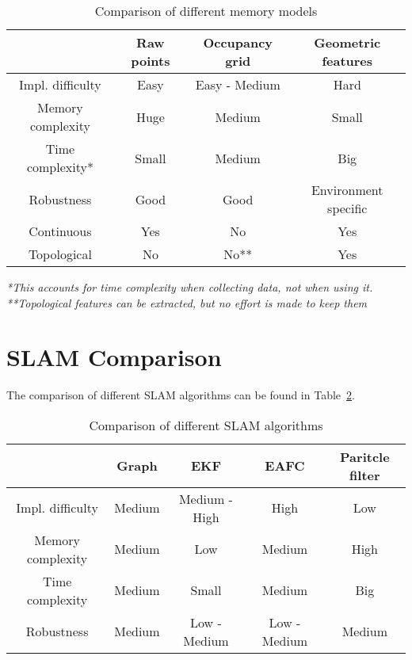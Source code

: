 \documentclass[12pt, a4paper, onecolumn]{article}
\begin{document}
\begin{table}[h!]
  \begin{center}
    \begin{tabular}[c]{|c | c c c|}
      \hline
       & Raw points & Occupancy grid & Geometric features \\
      \hline
      Impl. difficulty & Easy & Easy - Medium & Hard \\
      \hline
      Memory complexity & Huge & Medium & Small \\
      \hline
      Time complexity* & Small & Medium & Big \\
      \hline
      Robustness & Good & Good & Environment specific \\
      \hline
      Continuous & Yes & No & Yes \\
      \hline
      Topological & No & No** & Yes \\
      \hline
    \end{tabular}
  \end{center}
  \caption{Comparison of different memory models}
  \label{tab:memory_models}
\end{table}
\textit{*This accounts for time complexity when collecting data, not when using it.} \\
\textit{**Topological features can be extracted, but no effort is made to keep them}

\section{SLAM Comparison}
The comparison of different SLAM algorithms can be found in Table~\ref{tab:slam_algorithms}.
\begin{table}[h!]
  \begin{center}
    \begin{tabular}[c]{|c | c c c c |}
      \hline
                       & Graph          & EKF           & EAFC         & Paritcle filter \\
      \hline
      Impl. difficulty & Medium         & Medium - High & High         & Low \\
      \hline
      Memory complexity& Medium         & Low           & Medium       & High \\
      \hline
      Time complexity  & Medium         & Small         & Medium       & Big \\
      \hline
      Robustness       & Medium         & Low - Medium  & Low - Medium & Medium \\
      \hline
    \end{tabular}
  \end{center}
  \caption{Comparison of different SLAM algorithms}
  \label{tab:slam_algorithms}
\end{table}
\end{document}

